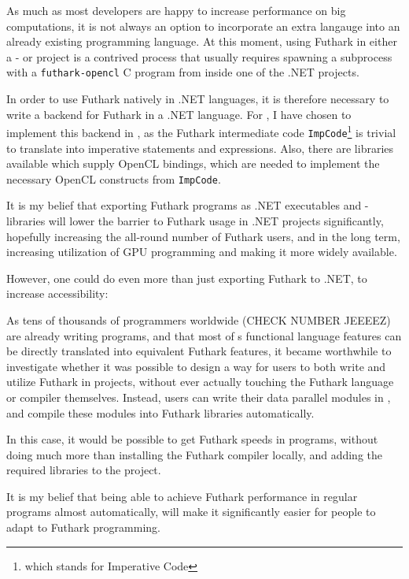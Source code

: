 As much as most developers are happy to increase performance on big
computations, it is not always an option to incorporate an extra langauge into
an already existing programming language. At this moment, using Futhark in
either a \csharp{}- or \fsharp{} project is a contrived process that usually
requires spawning a subprocess with a \texttt{futhark-opencl} C program from inside one of the .NET
projects.

In order to use Futhark natively in .NET languages, it is therefore
necessary to write a backend for Futhark in a .NET language.
For \fshark{}, I have chosen to implement this backend in \csharp{}, as the Futhark intermediate
code \texttt{ImpCode}\footnote{which stands for Imperative Code} is trivial to
translate into imperative \csharp{} statements and expressions.
Also, there are \csharp{} libraries available which supply OpenCL bindings, which are
needed to implement the necessary OpenCL constructs from \texttt{ImpCode}.

It is my belief that exporting Futhark programs as .NET executables and
-libraries will lower the barrier to Futhark usage in .NET projects
significantly, hopefully increasing the all-round number of Futhark users, and
in the long term, increasing utilization of GPU programming and making it more
widely available.

However, one could do even more than just exporting Futhark to .NET, to increase
accessibility:

As tens of thousands of programmers worldwide (CHECK NUMBER JEEEEZ) are already
writing \fsharp{} programs, and that most of \fsharp{}s functional language features can be
directly translated into equivalent Futhark features, it became worthwhile to
investigate whether it was possible to design a way for users to both write and
utilize Futhark in \fsharp{} projects, without ever actually touching the
Futhark language or compiler themselves.
Instead, users can write their data parallel \fsharp{} modules in \fshark{}, and compile these
modules into Futhark libraries automatically.

In this case, it would be possible to get Futhark speeds in \fsharp{} programs,
without doing much more than installing the Futhark compiler locally, and adding
the required \fshark{} libraries to the \fsharp{} project.

It is my belief that being able to achieve Futhark performance in regular \fsharp{}
programs almost automatically, will make it significantly easier for people to
adapt to Futhark programming.

